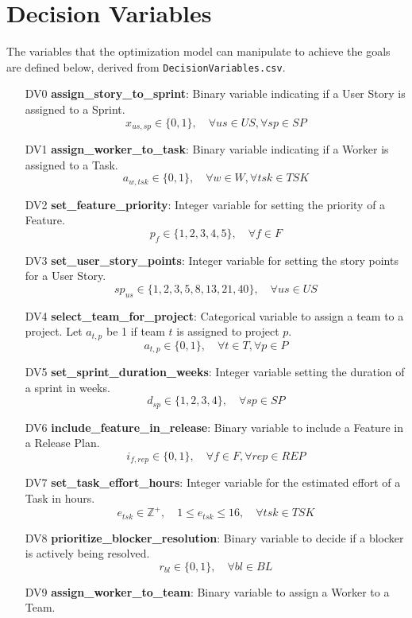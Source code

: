 \documentclass[11pt]{article}
\begin{document}
\section{Decision Variables}
The variables that the optimization model can manipulate to achieve the goals are defined below, derived from \texttt{DecisionVariables.csv}.

\begin{itemize}
    \item[DV0] \textbf{assign\_story\_to\_sprint}: Binary variable indicating if a User Story is assigned to a Sprint.
    $$ x_{us, sp} \in \{0, 1\}, \quad \forall us \in US, \forall sp \in SP $$
    \item[DV1] \textbf{assign\_worker\_to\_task}: Binary variable indicating if a Worker is assigned to a Task.
    $$ a_{w, tsk} \in \{0, 1\}, \quad \forall w \in W, \forall tsk \in TSK $$
    \item[DV2] \textbf{set\_feature\_priority}: Integer variable for setting the priority of a Feature.
    $$ p_f \in \{1, 2, 3, 4, 5\}, \quad \forall f \in F $$
    \item[DV3] \textbf{set\_user\_story\_points}: Integer variable for setting the story points for a User Story.
    $$ sp_{us} \in \{1, 2, 3, 5, 8, 13, 21, 40\}, \quad \forall us \in US $$
    \item[DV4] \textbf{select\_team\_for\_project}: Categorical variable to assign a team to a project. Let $a_{t,p}$ be 1 if team $t$ is assigned to project $p$.
    $$ a_{t, p} \in \{0, 1\}, \quad \forall t \in T, \forall p \in P $$
    \item[DV5] \textbf{set\_sprint\_duration\_weeks}: Integer variable setting the duration of a sprint in weeks.
    $$ d_{sp} \in \{1, 2, 3, 4\}, \quad \forall sp \in SP $$
    \item[DV6] \textbf{include\_feature\_in\_release}: Binary variable to include a Feature in a Release Plan.
    $$ i_{f, rep} \in \{0, 1\}, \quad \forall f \in F, \forall rep \in REP $$
    \item[DV7] \textbf{set\_task\_effort\_hours}: Integer variable for the estimated effort of a Task in hours.
    $$ e_{tsk} \in \mathbb{Z}^+, \quad 1 \leq e_{tsk} \leq 16, \quad \forall tsk \in TSK $$
    \item[DV8] \textbf{prioritize\_blocker\_resolution}: Binary variable to decide if a blocker is actively being resolved.
    $$ r_{bl} \in \{0, 1\}, \quad \forall bl \in BL $$
    \item[DV9] \textbf{assign\_worker\_to\_team}: Binary variable to assign a Worker to a Team.

\end{itemize}
\end{document}
